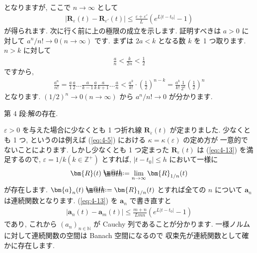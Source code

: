 \documentclass[openany, a4paper, oneside]{jsbook}
\makeatletter
\newcommand*{\defeq}{\mathrel{\rlap{%
\raisebox{0.3ex}{$\m@th\cdot$}}%
\raisebox{-0.3ex}{$\m@th\cdot$}}%
=}
\theoremstyle{break}
\theoremstyle{breakdefn}
\newcommand{\abs}[1]{\left|#1\right|}
\newcommand{\bN}{\mathbb{N}}
\newcommand{\bbZ}{\mathbb{Z}}
\newcommand{\vep}{\varepsilon}
\makeatother
\begin{document}
となりますが, ここで $n\to\infty$ として
\begin{gather}
 \abs{\bm{R}_{\vep} (t) - \bm{R}_{\vep '} (t)}
 \leq
 \frac{\vep + \vep '} {L} \left ( e^{ L | t - t_0 | } -1 \right) \label{eq:4-13}
\end{gather}
が得られます.
次に行く前に上の極限の成立を示します. 証明すべきは $a>0$ に対して $a^n/n! \to 0 ( n \to \infty )$ です.
まずは $2a<k$ となる数 $k$ を 1 つ取ります.
$n>k$ に対して
\begin{gather}
 \frac{a}{n}
 <
 \frac{k}{2n}
 <
 \frac{1}{2}
\end{gather}
ですから,
\begin{gather}
 \frac{a^n} {n!}
 =
 \frac{a}{1} \frac{a}{2} \dots \frac{a}{k-1} \frac{a}{k} \frac{a}{k+1} \dots \frac{a}{n}
 <
 \frac{a^k}{k!} \cdot \left ( \frac{1}{2} \right) ^{n-k}
 =
 \frac{a^k}{k!} \frac{1}{2^k} \left ( \frac{1}{2} \right)^n
\end{gather}
となります.
$(1/2)^n \to 0 (n \to \infty)$ から $a^n/n! \to 0$ が分かります.

第 4 段:解の存在.

$\vep>0$ を与えた場合に少なくとも 1 つ折れ線 $\bm{R}_{\vep}(t)$ が定まりました.
少なくとも 1 つ, というのは例えば (\ref{eq:4-5}) における $\kappa = \kappa (\vep)$ の定め方が
一意的でないことによります.
しかし少なくとも 1 つ定まった $\bm{R}_{\vep}(t)$ は (\ref{eq:4-13}) を満足するので,
$\vep = 1/k (k \in \bbZ^+)$ とすれば,  $| t - t_0 | \leq h$ において一様に
\begin{gather}
\bm{R}(t)
\defeq
\lim_{n\to\infty} \bm{R}_{ 1/n } (t)
\label{eq:4-14}
\end{gather}
が存在します.
$\bm{a}_n (t) \defeq \bm{R}_{1/n}(t)$ とすれば全ての $n$ について $\bm{a}_n$ は連続関数となります.
(\ref{eq:4-13}) を $\bm{a}_n$ で書き直すと
\begin{gather}
\abs{\bm{a}_n (t) - \bm{a}_m (t)}
\leq
\frac{m + n} {Lmn} ( e^{ L | t - t_0 |} - 1 )
\label{eq:4-1.42}
\end{gather}
であり, これから $(a_n)_{n\in \bN}$ が Cauchy 列であることが分かります.
一様ノルムに対して連続関数の空間は Banach 空間になるので
収束先が連続関数として確かに存在します.
\end{document}
